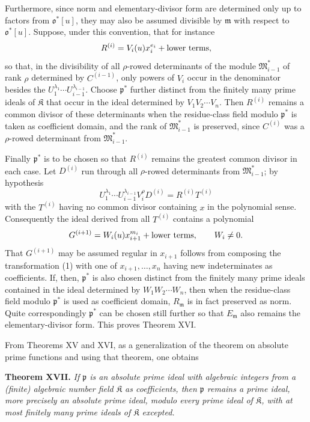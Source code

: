 \documentclass[11pt]{article}
\providecommand{\frakm}{\mathfrak m}
\providecommand{\frakp}{\mathfrak p}
\begin{document}
Furthermore, since norm and elementary-divisor form are determined only up to factors from $\mathfrak o^*[u]$, they may also be assumed divisible by $\frakm$ with respect to $\mathfrak o^*[u]$. Suppose, under this convention, that for instance
\[
 R^{(i)}=V_i(u)x_i^{e_i}+\hbox{lower terms},
\]
so that, in the divisibility of all $\rho$-rowed determinants of the module $\mathfrak M_{i-1}^*$ of rank $\rho$ determined by $C^{(i-1)}$, only powers of $V_i$ occur in the denominator besides the $U_1^{\lambda_1}\cdots U_{i-1}^{\lambda_{i-1}}$. Choose $\frakp^*$ further distinct from the finitely many prime ideals of $\mathfrak K$ that occur in the ideal determined by $V_1V_2\cdots V_n$. Then $R^{(i)}$ remains a common divisor of these determinants when the residue-class field modulo $\frakp^*$ is taken as coefficient domain, and the rank of $\mathfrak M_{i-1}^*$ is preserved, since $C^{(i)}$ was a $\rho$-rowed determinant from $\mathfrak M_{i-1}^*$.

Finally $\frakp^*$ is to be chosen so that $R^{(i)}$ remains the greatest common divisor in each case. Let $D^{(i)}$ run through all $\rho$-rowed determinants from $\mathfrak M_{i-1}^*$; by hypothesis
\[
 U_1^{\lambda_1}\cdots U_{i-1}^{\lambda_{i-1}}V_i^{\rho}D^{(i)}=R^{(i)}T^{(i)}
\]
with the $T^{(i)}$ having no common divisor containing $x$ in the polynomial sense. Consequently the ideal derived from all $T^{(i)}$ contains a polynomial
\[
 G^{(i+1)}=W_i(u)x_{i+1}^{m_i}+\hbox{lower terms},\qquad W_i\ne0.
\]
That $G^{(i+1)}$ may be assumed regular in $x_{i+1}$ follows from composing the transformation (1) with one of $x_{i+1},\ldots,x_n$ having new indeterminates as coefficients. If, then, $\frakp^*$ is also chosen distinct from the finitely many prime ideals contained in the ideal determined by $W_1W_2\cdots W_n$, then when the residue-class field modulo $\frakp^*$ is used as coefficient domain, $R_\frakm$ is in fact preserved as norm. Quite correspondingly $\frakp^*$ can be chosen still further so that $E_\frakm$ also remains the elementary-divisor form. This proves Theorem XVI.

From Theorems XV and XVI, as a generalization of the theorem on absolute prime functions and using that theorem, one obtains

\textbf{Theorem XVII.} \emph{If $\frakp$ is an absolute prime ideal with algebraic integers from a (finite) algebraic number field $\mathfrak K$ as coefficients, then $\frakp$ remains a prime ideal, more precisely an absolute prime ideal, modulo every prime ideal of $\mathfrak K$, with at most finitely many prime ideals of $\mathfrak K$ excepted.}
\end{document}
